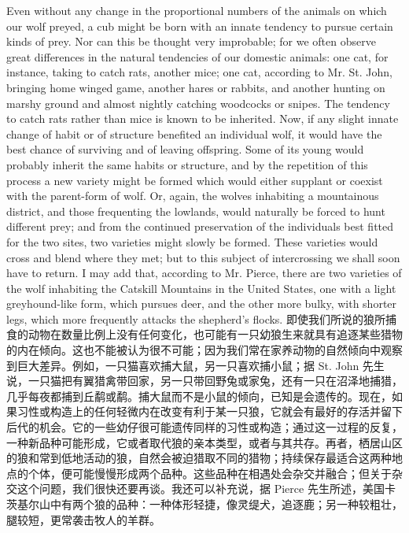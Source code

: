\darwinpair
{Even without any change in the proportional numbers of the animals on which our wolf preyed, a cub might be born with an innate tendency to pursue certain kinds of prey. Nor can this be thought very improbable; for we often observe great differences in the natural tendencies of our domestic animals: one cat, for instance, taking to catch rats, another mice; one cat, according to Mr. St. John, bringing home winged game, another hares or rabbits, and another hunting on marshy ground and almost nightly catching woodcocks or snipes. The tendency to catch rats rather than mice is known to be inherited. Now, if any slight innate change of habit or of structure benefited an individual wolf, it would have the best chance of surviving and of leaving offspring. Some of its young would probably inherit the same habits or structure, and by the repetition of this process a new variety might be formed which would either supplant or coexist with the parent-form of wolf. Or, again, the wolves inhabiting a mountainous district, and those frequenting the lowlands, would naturally be forced to hunt different prey; and from the continued preservation of the individuals best fitted for the two sites, two varieties might slowly be formed. These varieties would cross and blend where they met; but to this subject of intercrossing we shall soon have to return. I may add that, according to Mr. Pierce, there are two varieties of the wolf inhabiting the Catskill Mountains in the United States, one with a light greyhound-like form, which pursues deer, and the other more bulky, with shorter legs, which more frequently attacks the shepherd's flocks.}
{即使我们所说的狼所捕食的动物在数量比例上没有任何变化，也可能有一只幼狼生来就具有追逐某些猎物的内在倾向。这也不能被认为很不可能；因为我们常在家养动物的自然倾向中观察到巨大差异。例如，一只猫喜欢捕大鼠，另一只喜欢捕小鼠；据 St. John 先生说，一只猫把有翼猎禽带回家，另一只带回野兔或家兔，还有一只在沼泽地捕猎，几乎每夜都捕到丘鹬或鹬。捕大鼠而不是小鼠的倾向，已知是会遗传的。现在，如果习性或构造上的任何轻微内在改变有利于某一只狼，它就会有最好的存活并留下后代的机会。它的一些幼仔很可能遗传同样的习性或构造；通过这一过程的反复，一种新品种可能形成，它或者取代狼的亲本类型，或者与其共存。再者，栖居山区的狼和常到低地活动的狼，自然会被迫猎取不同的猎物；持续保存最适合这两种地点的个体，便可能慢慢形成两个品种。这些品种在相遇处会杂交并融合；但关于杂交这个问题，我们很快还要再谈。我还可以补充说，据 Pierce 先生所述，美国卡茨基尔山中有两个狼的品种：一种体形轻捷，像灵缇犬，追逐鹿；另一种较粗壮，腿较短，更常袭击牧人的羊群。}

